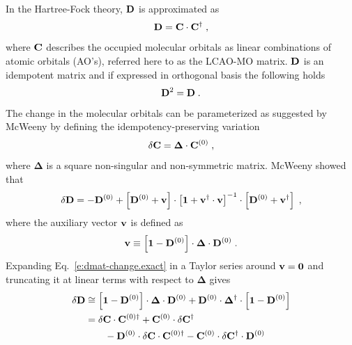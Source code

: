 \documentclass[aip,amsmath,amssymb,reprint,floatfix]{revtex4-1}
\newcommand{\BM}[1]{\bm{#1}}
\begin{document}
In the Hartree\hyp{}Fock theory,\cite{Roothaan.RevModPhys.1951} ${\bf D}$ is approximated as
%
\begin{equation}
 {\bf D} = {\bf C} \cdot {\bf C}^\dagger \;,
\end{equation}
%
where ${\bf C}$ describes the occupied molecular orbitals as linear combinations
of atomic orbitals (AO's), referred here to as the LCAO-MO matrix.
${\bf D}$ is an idempotent matrix and if expressed in orthogonal basis the following holds
%
\begin{equation}
 {\bf D}^2 = {\bf D} \;.
\end{equation}
%
The change in the molecular orbitals can be parameterized as suggested by McWeeny\cite{McWeeny.RevModPhys.1960}
by defining the idempotency\hyp{}preserving variation
%
\begin{equation}
 \delta {\bf C} = {\BM\Delta} \cdot {\bf C}^{(0)} \;,
\end{equation}
%
where $\BM\Delta$ is a square non\hyp{}singular and non\hyp{}symmetric matrix.
McWeeny showed that
%
\begin{equation} \label{e:dmat-change.exact}
 \delta {\bf D} = -{\bf D}^{(0)} + \left[ {\bf D}^{(0)} + {\bf v} \right] \cdot
                                   \left[ {\bf 1} + {\bf v}^\dagger \cdot {\bf v} \right]^{-1} \cdot
                                   \left[ {\bf D}^{(0)} + {\bf v}^\dagger \right] \;,
\end{equation}
%
where the auxiliary vector ${\bf v}$ is defined as
%
\begin{equation}
 {\bf v} \equiv \left[ {\bf 1} - {\bf D}^{(0)} \right] \cdot {\BM\Delta} \cdot {\bf D}^{(0)}  \;.
\end{equation}
%
Expanding Eq.~\eqref{e:dmat-change.exact} in a Taylor series around ${\bf v}={\bf 0}$ and
truncating it at linear terms with respect to ${\BM\Delta}$ gives
%
\begin{subequations} 
 \begin{align}
 \delta {\bf D} &\cong \left[ {\bf 1} - {\bf D}^{(0)} \right] \cdot {\BM\Delta} \cdot {\bf D}^{(0)} + 
                        {\bf D}^{(0)} \cdot {\BM\Delta}^\dagger \cdot \left[ {\bf 1} - {\bf D}^{(0)} \right]  
 \label{e:dD-1} \\  &= 
  \delta {\bf C} \cdot {\bf C}^{(0)\dagger} + {\bf C}^{(0)} \cdot \delta {\bf C}^\dagger \nonumber \\
           &\qquad - {\bf D}^{(0)} \cdot \delta {\bf C} \cdot {\bf C}^{{(0)}\dagger} 
                   - {\bf C}^{(0)} \cdot \delta {\bf C}^\dagger \cdot {\bf D}^{(0)} 
 \label{e:dD-2}
 \end{align}
\end{subequations}
\end{document}
